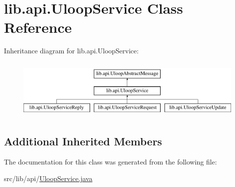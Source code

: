 \hypertarget{classlib_1_1api_1_1UloopService}{\section{lib.\+api.\+Uloop\+Service Class Reference}
\label{classlib_1_1api_1_1UloopService}
}
Inheritance diagram for lib.\+api.\+Uloop\+Service\+:\begin{figure}[H]
\begin{center}
\leavevmode
\includegraphics[height=2.978723cm]{classlib_1_1api_1_1UloopService}
\end{center}
\end{figure}
\subsection*{Additional Inherited Members}


The documentation for this class was generated from the following file\+:\begin{DoxyCompactItemize}
\item 
src/lib/api/\hyperlink{UloopService_8java}{Uloop\+Service.\+java}\end{DoxyCompactItemize}
